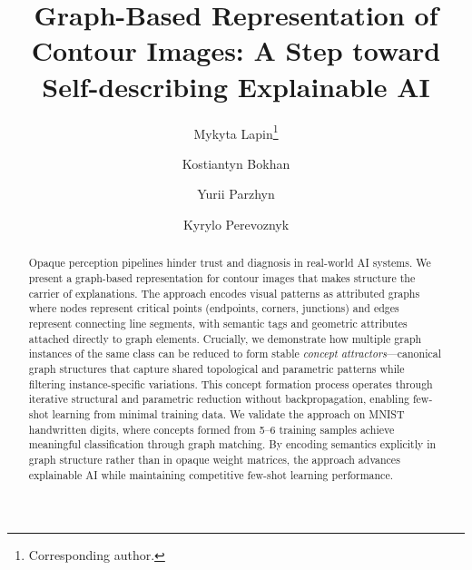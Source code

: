 \documentclass[runningheads]{llncs}
\begin{document}
\title{Graph-Based Representation of Contour Images: A Step toward Self-describing Explainable AI}

\author{Mykyta Lapin\thanks{Corresponding author.} \and
Kostiantyn Bokhan \and
Yurii Parzhyn \and
Kyrylo Perevoznyk}


\maketitle

\begin{abstract}
Opaque perception pipelines hinder trust and diagnosis in real-world AI systems. We present a graph-based representation for contour images that makes structure the carrier of explanations. The approach encodes visual patterns as attributed graphs where nodes represent critical points (endpoints, corners, junctions) and edges represent connecting line segments, with semantic tags and geometric attributes attached directly to graph elements. Crucially, we demonstrate how multiple graph instances of the same class can be reduced to form stable \textit{concept attractors}---canonical graph structures that capture shared topological and parametric patterns while filtering instance-specific variations. This concept formation process operates through iterative structural and parametric reduction without backpropagation, enabling few-shot learning from minimal training data. We validate the approach on MNIST handwritten digits, where concepts formed from 5--6 training samples achieve meaningful classification through graph matching. By encoding semantics explicitly in graph structure rather than in opaque weight matrices, the approach advances explainable AI while maintaining competitive few-shot learning performance.

\end{abstract}
\end{document}
